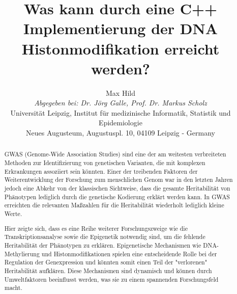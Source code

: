 \documentclass{SeminarV2}
\begin{document}
\title{Was kann durch eine C++ Implementierung der DNA Histonmodifikation erreicht werden?}

\author{Max Hild
\vspace{.3cm}\\
%
\emph{Abgegeben bei: Dr. J{\"o}rg Galle, Prof. Dr. Markus Scholz}
\vspace{.1cm}\\
Universit{\"a}t Leipzig, Institut f{\"u}r medizinische Informatik, Statistik und Epidemiologie\\
Neues Augusteum, Augustuspl. 10, 04109 Leipzig - Germany
}



\maketitle

\begin{abstract}
  \sloppy
  GWAS (Genome-Wide Association Studies) sind eine der am weitesten verbreiteten Methoden
  zur Identifizierung von genetischen Varianten, die mit komplexen Erkrankungen assoziiert sein k{\"o}nnten.
  Einer der treibenden Faktoren der Weiterentwicklung der Forschung zum menschlichen Genom
  war in den letzten Jahren jedoch eine Abkehr von der klassischen Sichtweise, dass die
  gesamte Heritabilit{\"a}t von Ph{\"a}notypen lediglich durch die genetische Kodierung
  erkl{\"a}rt werden kann. In GWAS erreichten die relevanten Ma{\ss}zahlen f{\"u}r die Heritabilit{\"a}t
  wiederholt lediglich kleine Werte. \cite{mcclellan-2010}
    
  Hier zeigte sich, dass es eine Reihe weiterer Forschungszweige wie die Transkriptionsanalyse
  sowie die Epigenetik notwendig sind, um die fehlende Heritabilität der Phänotypen zu erklären. 
  Epigenetische Mechanismen wie DNA-Methylierung und Histonmodifikationen spielen eine entscheidende 
  Rolle bei der Regulation der Genexpression und k{\"o}nnten somit einen Teil der "verlorenen" Heritabilität 
  aufklären. Diese Mechanismen sind dynamisch und k{\"o}nnen durch Umweltfaktoren beeinflusst werden, 
  was sie zu einem spannenden Forschungsfeld macht.
  \end{abstract}
  
\end{document}
